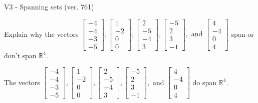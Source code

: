 \begin{exercise}
  \begin{exerciseTitle}V3 - Spanning sets (ver. 761)\end{exerciseTitle}
  \begin{exerciseStatement}
    Explain why the vectors \(\left[\begin{array}{r}
-4 \\
-4 \\
-3 \\
-5
\end{array}\right] , \left[\begin{array}{r}
1 \\
-2 \\
0 \\
0
\end{array}\right] , \left[\begin{array}{r}
2 \\
-5 \\
-4 \\
3
\end{array}\right] , \left[\begin{array}{r}
-5 \\
2 \\
3 \\
-1
\end{array}\right] , \text{ and } \left[\begin{array}{r}
4 \\
-4 \\
0 \\
4
\end{array}\right]\) span or don't span \(\mathbb{R}^4\). 
	


  \end{exerciseStatement}
  \begin{exerciseAnswer}
   The vectors \(\left[\begin{array}{r}
-4 \\
-4 \\
-3 \\
-5
\end{array}\right] , \left[\begin{array}{r}
1 \\
-2 \\
0 \\
0
\end{array}\right] , \left[\begin{array}{r}
2 \\
-5 \\
-4 \\
3
\end{array}\right] , \left[\begin{array}{r}
-5 \\
2 \\
3 \\
-1
\end{array}\right] , \text{ and } \left[\begin{array}{r}
4 \\
-4 \\
0 \\
4
\end{array}\right]\) 
  	 do  
	span \(\mathbb{R}^4\).
  



\end{exerciseAnswer}
\end{exercise}
